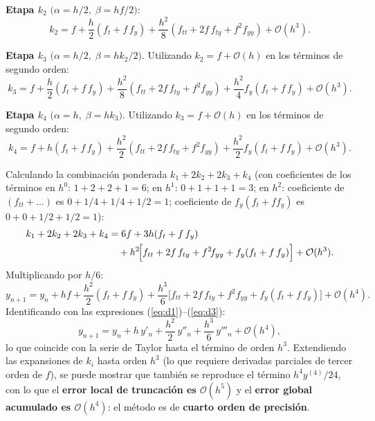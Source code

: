 \documentclass[10pt,onecolumn]{article}
\begin{document}
\noindent
\textbf{Etapa $k_2$} $\bigl(\alpha = h/2,\;\beta = hf/2\bigr)$:
\begin{equation}
    k_2 = f + \frac{h}{2}(f_t + f\,f_y) + \frac{h^2}{8}(f_{tt} + 2f\,f_{ty} + f^2\!f_{yy}) + \mathcal{O}(h^3).
\end{equation}

\noindent
\textbf{Etapa $k_3$} $\bigl(\alpha = h/2,\;\beta = hk_2/2\bigr)$. Utilizando $k_2 = f + \mathcal{O}(h)$ en los términos de segundo orden:
\begin{equation}
    k_3 = f + \frac{h}{2}(f_t + f\,f_y) + \frac{h^2}{8}(f_{tt} + 2f\,f_{ty} + f^2\!f_{yy}) + \frac{h^2}{4}f_y(f_t + f\,f_y) + \mathcal{O}(h^3).
\end{equation}

\noindent
\textbf{Etapa $k_4$} $\bigl(\alpha = h,\;\beta = hk_3\bigr)$. Utilizando $k_3 = f + \mathcal{O}(h)$ en los términos de segundo orden:
\begin{equation}
    k_4 = f + h(f_t + f\,f_y) + \frac{h^2}{2}(f_{tt} + 2f\,f_{ty} + f^2\!f_{yy}) + \frac{h^2}{2}f_y(f_t + f\,f_y) + \mathcal{O}(h^3).
\end{equation}

\medskip
Calculando la combinación ponderada $k_1 + 2k_2 + 2k_3 + k_4$ (con coeficientes de los términos en $h^0$: $1+2+2+1=6$; en $h^1$: $0+1+1+1=3$; en $h^2$: coeficiente de $(f_{tt}+\ldots)$ es $0+1/4+1/4+1/2=1$; coeficiente de $f_y(f_t+f f_y)$ es $0+0+1/2+1/2=1$):
\begin{align}
    k_1 + 2k_2 + 2k_3 + k_4 &= 6f + 3h(f_t + f\,f_y) \notag\\
    &\quad + h^2\!\Bigl[f_{tt} + 2f\,f_{ty} + f^2\!f_{yy} + f_y(f_t + f\,f_y)\Bigr] + \mathcal{O}(h^3).
\end{align}
Multiplicando por $h/6$:
\begin{equation}
    y_{n+1} = y_n + hf + \frac{h^2}{2}(f_t + f\,f_y) + \frac{h^3}{6}\bigl[f_{tt} + 2f\,f_{ty} + f^2\!f_{yy} + f_y(f_t + f\,f_y)\bigr] + \mathcal{O}(h^4).
\end{equation}
Identificando con las expresiones (\ref{eq:d1})--(\ref{eq:d3}):
\begin{equation}
    y_{n+1} = y_n + h\,y'_n + \frac{h^2}{2}\,y''_n + \frac{h^3}{6}\,y'''_n + \mathcal{O}(h^4),
\end{equation}
lo que coincide con la serie de Taylor hasta el término de orden $h^3$. Extendiendo las expansiones de $k_i$ hasta orden $h^3$ (lo que requiere derivadas parciales de tercer orden de $f$), se puede mostrar que también se reproduce el término $h^4 y^{(4)}/24$, con lo que el \textbf{error local de truncación es $\mathcal{O}(h^5)$} y el \textbf{error global acumulado es $\mathcal{O}(h^4)$}: el método es de \textbf{cuarto orden de precisión}.\cite{Burden2017RungeKutta} \cite{Gutierrez2024Metodos}
\end{document}
